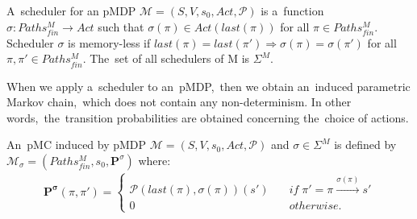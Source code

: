 \begin{definition}[Scheduler]
A~scheduler for an pMDP $\mathcal{M} = (S, V, s_0, Act, \mathcal{P})$ is a~function $\sigma: Paths_{fin}^{M} \rightarrow Act$ such that $\sigma(\pi) \in Act(last(\pi))$ for all $\pi \in Paths_{fin}^{M}$.
Scheduler $\sigma$ is memory-less if $last(\pi) = last(\pi') \Longrightarrow \sigma(\pi) = \sigma(\pi')$ for all $\pi, \pi' \in Paths_{fin}^{M}$.
The~set of all schedulers of M is $\Sigma^M$.
\end{definition}
\noindent 
When we apply a~scheduler to an~pMDP,~then we obtain an~induced parametric Markov chain,~which does not contain any non-determinism.
In other words,~the~transition probabilities are obtained concerning the~choice of actions.

\begin{definition} \label{def:incuded_mc}
\cite{cegar}
An~pMC induced by pMDP $\mathcal{M} = (S, V, s_0, Act, \mathcal{P})$ and $\sigma \in \Sigma^M$ is defined by $\mathcal{M}_{\sigma} = ( Paths_{fin}^{M}, s_0, \mathbf{P}^{\sigma})$ where:
\begin{align*}
    \mathbf{P^{\sigma}}(\pi, \pi') = 
    \begin{cases}
        \mathcal{P}(last(\pi), \sigma(\pi))(s') \quad & if \; \pi' = \pi \overset{\sigma(\pi)}{\rightarrow} s' \\
         0 \quad & otherwise.
    \end{cases}
\end{align*}
\end{definition}



